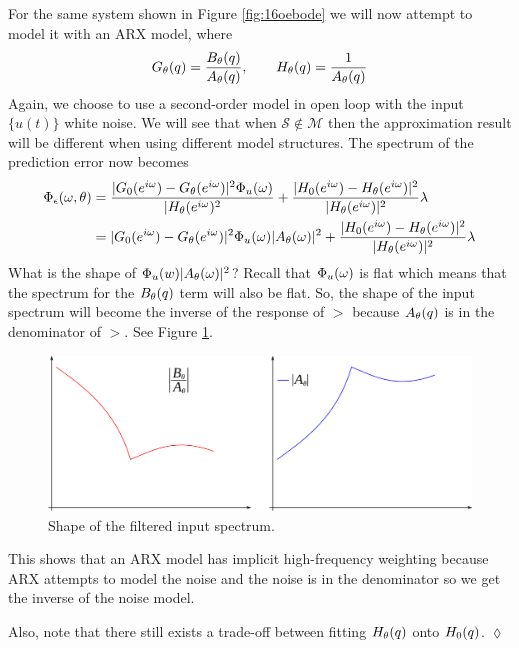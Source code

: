 \begin{example}
For the same system shown in Figure \ref{fig:16oebode} we will now attempt to model it with an ARX model, where
$$G_\theta(q)=\frac{B_\theta(q)}{A_\theta(q)}, \qquad H_\theta(q)=\frac{1}{A_\theta(q)}$$
Again, we choose to use a second-order model in open loop with the input $\{u(t)\}$ white noise. We will see that when $\mathcal{S}\notin\mathcal{M}$ then the approximation result will be different when using different model structures. The spectrum of the prediction error now becomes
\begin{align*}
\Phi_\epsilon(\omega,\theta) &= \frac{|G_0(e^{i\omega})-G_\theta(e^{i\omega})|^2\Phi_u(\omega)}{|H_\theta(e^{i\omega})^2} + \frac{|H_0(e^{i\omega})-H_\theta(e^{i\omega})|^2}{|H_\theta(e^{i\omega})|^2}\lambda \\
&= |G_0(e^{i\omega})-G_\theta(e^{i\omega})|^2\Phi_u(\omega)|A_\theta(\omega)|^2 + \frac{|H_0(e^{i\omega})-H_\theta(e^{i\omega})|^2}{|H_\theta(e^{i\omega})|^2}\lambda
\end{align*}
What is the shape of $\Phi_u(w)|A_\theta(\omega)|^2$? Recall that $\Phi_u(\omega)$ is flat which means that the spectrum for the $B_\theta(q)$ term will also be flat. So, the shape of the input spectrum will become the inverse of the response of $\gt$ because $A_\theta(q)$ is in the denominator of $\gt$. See Figure \ref{fig:16inv}.

\begin{figure}[ht!]
	\centering
	\includegraphics[width=.5\textwidth]{images/16inv}
	\caption{Shape of the filtered input spectrum.}
	\label{fig:16inv}
\end{figure}

This shows that an ARX model has implicit high-frequency weighting because ARX attempts to model the noise and the noise is in the denominator so we get the inverse of the noise model.

Also, note that there still exists a trade-off between fitting $H_\theta(q)$ onto $H_0(q)$.
$\lozenge$
\end{example}


